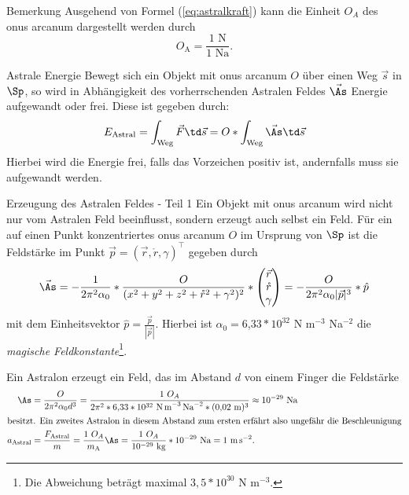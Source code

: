 \begin{bla}{Bemerkung}
Ausgehend von Formel (\ref{eq:astralkraft}) kann die Einheit $O_A$ des onus arcanum dargestellt werden durch
\begin{equation}
O_\text{A}=\frac{1\text{ N}}{1\text{ Na}}\text{.}
\end{equation}
\end{bla}
\begin{bla}{Astrale Energie}\label{astralenergie}
Bewegt sich ein Objekt mit onus arcanum $O$ über einen Weg $\vec{s}$ in $\Sp$, so wird in Abhängigkeit des vorherrschenden Astralen Feldes $\vec{\As}$ Energie aufgewandt oder frei. Diese ist gegeben durch:
\begin{equation}
E_\text{Astral}=\int_\text{Weg}\vec{F}\td\vec{s}=O*\int_\text{Weg}\vec{\As}\td\vec{s}
\end{equation}
Hierbei wird die Energie frei, falls das Vorzeichen positiv ist, andernfalls muss sie aufgewandt werden.
\end{bla}
\begin{bla}{Erzeugung des Astralen Feldes - Teil 1}
Ein Objekt mit onus arcanum wird nicht nur vom Astralen Feld beeinflusst, sondern erzeugt auch selbst ein Feld. Für ein auf einen Punkt konzentriertes onus arcanum $O$ im Ursprung von $\Sp$ ist die Feldstärke im Punkt $\vec{p}=(\vec{r},\mathring{r},\gamma)^\top$ gegeben durch
\begin{equation}
\vec{\As}=-\frac{1}{2\pi^2\alpha_0}*\frac{O}{(x^2+y^2+z^2+\mathring{r}^2+\gamma^2)^2}*\begin{pmatrix}\vec{r}\\\mathring{r}\\\gamma\end{pmatrix}=-\frac{O}{2\pi^2\alpha_0|\vec{p}|^3}*\hat{p}
\end{equation}
mit dem Einheitsvektor $\hat{p}=\frac{\vec{p}}{|\vec{p}|}$. Hierbei ist $\alpha_0=6$,$33*10^{32}$ N\! m$^{-3}$\! Na$^{-2}$ die \emph{magische Feldkonstante}\footnote{Die Abweichung beträgt maximal $3,5*10^{30}$ N\! m$^{-3}$.}.
\end{bla}
\begin{bsp}
Ein Astralon erzeugt ein Feld, das im Abstand $d$ von einem Finger die Feldstärke
\begin{align*}
\As&=\frac{O}{2\pi^2\alpha_0d^3}=\frac{1\text{ }O_A}{2\pi^2*6{,}33*10^{32}\text{ N\! m}^{-3}\text{\! Na}^{-2}*(0{,}02\text{ m})^3}\approx10^{-29}\text{ Na}\\
\intertext{besitzt. Ein zweites Astralon in diesem Abstand zum ersten erfährt also ungefähr die Beschleunigung}
a_\text{Astral}&=\frac{F_\text{Astral}}{m}=\frac{1\text{ }O_A}{m_\text{A}}\As=\frac{1\text{ }O_A}{10^{-29}\text{ kg}}*10^{-29}\text{ Na}=1\text{ m\! s}^{-2}\text{.}
\end{align*}
\end{bsp}
